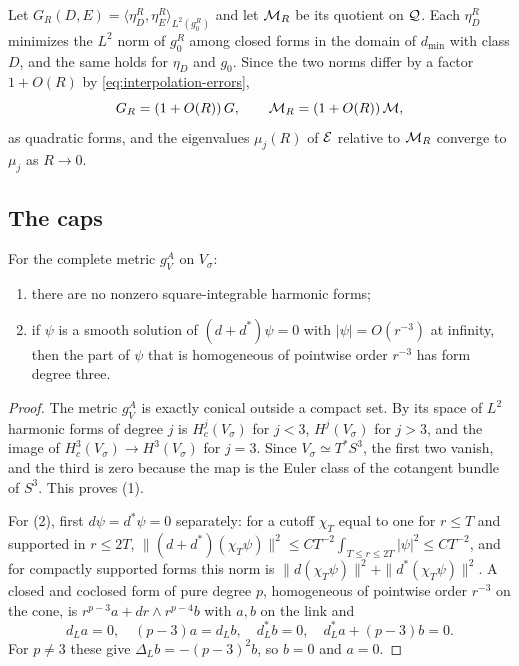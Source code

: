 Let $G_R(D,E)=\langle\eta^R_D,\eta^R_E\rangle_{L^2(g_0^R)}$ and let
$\mathcal M_R$ be its quotient on $\mathcal Q$. Each $\eta^R_D$ minimizes the $L^2$
norm of $g_0^R$ among closed forms in the domain of $d_{\min}$ with
class $D$, and the same holds for $\eta_D$ and $g_0$. Since the two
norms differ by a factor $1+O(R)$ by \eqref{eq:interpolation-errors},
\begin{equation}\label{eq:mass-limit}
 G_R=(1+O(R))\,G,\qquad\mathcal M_R=(1+O(R))\,\mathcal M,
\end{equation}
as quadratic forms, and the eigenvalues $\mu_j(R)$ of $\mathcal E$ relative to
$\mathcal M_R$ converge to $\mu_j$ as $R\to0$.

\subsection{The caps}
\begin{lemma}\label{lem:cap-kernels}
For the complete metric $g_V^A$ on $V_\sigma$:
\begin{enumerate}
\item there are no nonzero square-integrable harmonic forms;
\item if $\psi$ is a smooth solution of $(d+d^*)\psi=0$ with
$|\psi|=O(r^{-3})$ at infinity, then the part of $\psi$ that is
homogeneous of pointwise order $r^{-3}$ has form degree three.
\end{enumerate}
\end{lemma}
\begin{proof}
The metric $g_V^A$ is exactly conical outside a compact set. By
\cite[Theorem~1A]{hhm} its space of $L^2$ harmonic forms of degree $j$ is
$H^j_c(V_\sigma)$ for $j<3$, $H^j(V_\sigma)$ for $j>3$, and the image of
$H^3_c(V_\sigma)\to H^3(V_\sigma)$ for $j=3$. Since $V_\sigma\simeq
T^*S^3$, the first two vanish, and the third is zero because the map is
the Euler class of the cotangent bundle of $S^3$. This proves (1).

For (2), first $d\psi=d^*\psi=0$ separately: for a cutoff $\chi_T$ equal
to one for $r\le T$ and supported in $r\le2T$,
$\|(d+d^*)(\chi_T\psi)\|^2\le CT^{-2}\int_{T\le r\le2T}|\psi|^2\le
CT^{-2}$, and for compactly supported forms this norm is
$\|d(\chi_T\psi)\|^2+\|d^*(\chi_T\psi)\|^2$. A closed and coclosed form
of pure degree $p$, homogeneous of pointwise order $r^{-3}$ on the cone,
is $r^{p-3}a+dr\wedge r^{p-4}b$ with $a,b$ on the link and
\[
 d_La=0,\quad(p-3)a=d_Lb,\quad d_L^*b=0,\quad d_L^*a+(p-3)b=0 .
\]
For $p\ne3$ these give $\Delta_Lb=-(p-3)^2b$, so $b=0$ and $a=0$.
\end{proof}

